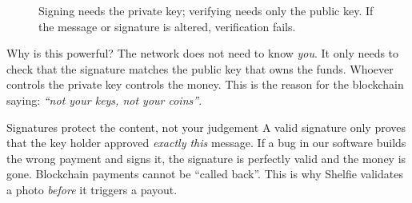 \begin{figure}[h]
\centering
{}
\caption{Signing needs the private key; verifying needs only the public key. If the message or signature is altered, verification fails.}
\end{figure}

Why is this powerful? The network does not need to know \emph{you}. It only needs to check that the signature matches the public key that owns the funds. Whoever controls the private key controls the money. This is the reason for the blockchain saying: \emph{``not your keys, not your coins''}.

\begin{warningbox}{Signatures protect the content, not your judgement}
A valid signature only proves that the key holder approved \emph{exactly this} message. If a bug in our software builds the wrong payment and signs it, the signature is perfectly valid and the money is gone. Blockchain payments cannot be ``called back''. This is why Shelfie validates a photo \emph{before} it triggers a payout.
\end{warningbox}


